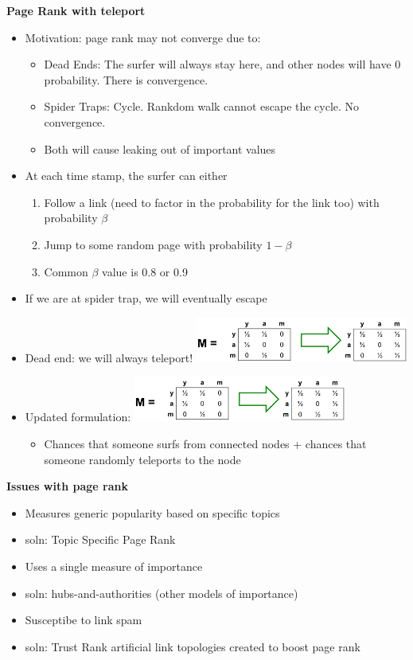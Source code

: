 \documentclass[10pt, landscape]{article}
\begin{document}
\begin{multicols}{4}
\textbf{Page Rank with teleport}
\begin{itemize}
  \item Motivation: page rank may not converge due to:
  \begin{itemize}
    \item Dead Ends: The surfer will always stay here, and other nodes will have 0 probability. There is convergence.
    \item Spider Traps: Cycle. Rankdom walk cannot escape the cycle. No convergence.
    \item Both will cause leaking out of important values
  \end{itemize}
  \item At each time stamp, the surfer can either 
  \begin{enumerate}
    \item Follow a link (need to factor in the probability for the link too) with probability $\beta$
    \item Jump to some random page with probability $1-\beta$
    \item Common $\beta$ value is 0.8 or 0.9
  \end{enumerate}
  \item If we are at spider trap, we will eventually escape 
  \item Dead end: we will always teleport! 
  \includegraphics*[width=7cm]{teleport_deadend.png}
  \item Updated formulation:
  \includegraphics*[width=7cm]{teleport_deadend.png}
  \begin{itemize}
    \item Chances that someone surfs from connected nodes + chances that someone randomly teleports to the node
  \end{itemize}
\end{itemize}


\textbf{Issues with page rank}
\begin{itemize}
  \item Measures generic popularity based on specific topics 
  \item soln: Topic Specific Page Rank
  \item Uses a single measure of importance 
  \item soln: hubs-and-authorities (other models of importance)
  \item Susceptibe to link spam
  \item soln: Trust Rank artificial link topologies created to boost page rank
\end{itemize}


\end{multicols}
\end{document}
